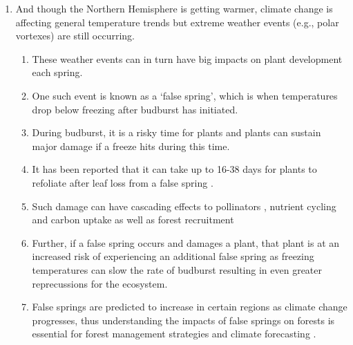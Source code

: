 \documentclass{article}\usepackage[]{graphicx}\usepackage[]{color}
\begin{document}
\begin{enumerate}
\item And though the Northern Hemisphere is getting warmer, climate change is affecting general temperature trends but extreme weather events (e.g., polar vortexes) are still occurring. 
  \begin{enumerate}
  \item These weather events can in turn have big impacts on plant development each spring. 
  \item One such event is known as a `false spring', which is when temperatures drop below freezing \citep[][i.e., below -2.2$^{\circ}$C]{Schwartz2002} after budburst has initiated.
  \item During budburst, it is a risky time for plants \citep{Chamberlain2019} and plants can sustain major damage if a freeze hits during this time. 
  \item It has been reported that it can take up to 16-38 days for plants to refoliate after leaf loss from a false spring \citep{Augspurger2009, Augspurger2013, Gu2008, Menzel2015}. 
  \item Such damage can have cascading effects to pollinators \citep{Boggs2012, Pardee2017}, nutrient cycling and carbon uptake as well as forest recruitment \citep{Hufkens2012, Klosterman2018, Richardson2013}
  \item Further, if a false spring occurs and damages a plant, that plant is at an increased risk of experiencing an additional false spring as freezing temperatures can slow the rate of budburst \citep{Augspurger2009} resulting in even greater reprecussions for the ecosystem.
  \item False springs are predicted to increase in certain regions as climate change progresses, thus understanding the impacts of false springs on forests is essential for forest management strategies and climate forecasting \citep{OBrien2019}.
  \end{enumerate}
  

\end{enumerate}
\end{document}
